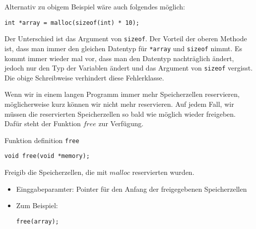 Alternativ zu obigem Beispiel wäre auch folgendes möglich:

\begin{lstlisting}
int *array = malloc(sizeof(int) * 10);
\end{lstlisting}

Der Unterschied ist das Argument von \texttt{sizeof}. Der Vorteil der oberen Methode ist, dass man immer den gleichen Datentyp für \texttt{*array} und \texttt{sizeof} nimmt. Es kommt immer wieder mal vor, dass man den Datentyp nachträglich ändert, jedoch nur den Typ der Variablen ändert und das Argument von \texttt{sizeof} vergisst. Die obige Schreibweise verhindert diese Fehlerklasse.

Wenn wir in einem langen Programm immer mehr Speicherzellen reservieren, 
möglicherweise kurz können wir nicht mehr reservieren. Auf jedem Fall, wir müssen
die reservierten Speicherzellen so bald wie möglich wieder freigeben. Dafür steht
der Funktion $free$ zur Verfügung.
\begin{myexampleblock}{Funktion definition \texttt{free}}
\begin{lstlisting}
void free(void *memory);
\end{lstlisting}
\vspace{-0.7cm}
Freigib die Speicherzellen, die mit $malloc$ reservierten wurden.
\begin{itemize}
\item Einggabeparamter: Pointer für den Anfang der freigegebenen Speicherzellen
\item Zum Beispiel:
\begin{lstlisting}
free(array);
\end{lstlisting}
\end{itemize}
\vspace{-0.7cm}
\end{myexampleblock}

